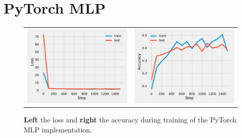 \documentclass{article}
\newcommand\·{\ensuremath{\cdot}}
\newcommand\…{\ensuremath{\ldots}}
\newcommand\1{\ensuremath{\mathds{1}}}
\begin{document}
\section{PyTorch MLP}
\begin{figure}
  \begin{tabularx}{\linewidth}{XX}
    \includegraphics[width=\linewidth]{assignment_1/code/torch_loss.pdf} &
    \includegraphics[width=\linewidth]{assignment_1/code/torch_accuracy.pdf}
  \end{tabularx}
  \caption{\textbf{Left} the loss and \textbf{right} the accuracy during training of the PyTorch MLP implementation.}
  \label{fig:pytorch_mlp}
\end{figure}
\end{document}
